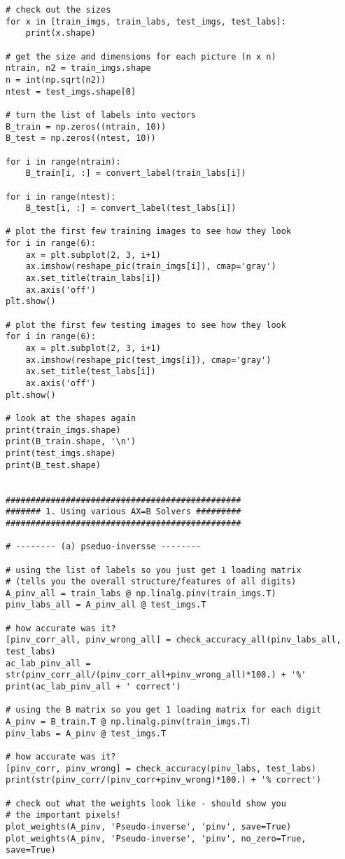 \documentclass[10pt]{article}
\begin{document}
\begin{lstlisting}
# check out the sizes
for x in [train_imgs, train_labs, test_imgs, test_labs]:
    print(x.shape)

# get the size and dimensions for each picture (n x n)
ntrain, n2 = train_imgs.shape
n = int(np.sqrt(n2)) 
ntest = test_imgs.shape[0]

# turn the list of labels into vectors
B_train = np.zeros((ntrain, 10))
B_test = np.zeros((ntest, 10))

for i in range(ntrain):
    B_train[i, :] = convert_label(train_labs[i])

for i in range(ntest):
    B_test[i, :] = convert_label(test_labs[i])
    
# plot the first few training images to see how they look
for i in range(6):
    ax = plt.subplot(2, 3, i+1)
    ax.imshow(reshape_pic(train_imgs[i]), cmap='gray')
    ax.set_title(train_labs[i])
    ax.axis('off')
plt.show()

# plot the first few testing images to see how they look
for i in range(6):
    ax = plt.subplot(2, 3, i+1)
    ax.imshow(reshape_pic(test_imgs[i]), cmap='gray')
    ax.set_title(test_labs[i])
    ax.axis('off')
plt.show()

# look at the shapes again
print(train_imgs.shape)
print(B_train.shape, '\n')
print(test_imgs.shape)
print(B_test.shape)


###############################################
####### 1. Using various AX=B Solvers #########
###############################################

# -------- (a) pseduo-inversse --------

# using the list of labels so you just get 1 loading matrix 
# (tells you the overall structure/features of all digits)
A_pinv_all = train_labs @ np.linalg.pinv(train_imgs.T)
pinv_labs_all = A_pinv_all @ test_imgs.T

# how accurate was it?
[pinv_corr_all, pinv_wrong_all] = check_accuracy_all(pinv_labs_all, test_labs)
ac_lab_pinv_all = str(pinv_corr_all/(pinv_corr_all+pinv_wrong_all)*100.) + '%'
print(ac_lab_pinv_all + ' correct')

# using the B matrix so you get 1 loading matrix for each digit
A_pinv = B_train.T @ np.linalg.pinv(train_imgs.T)
pinv_labs = A_pinv @ test_imgs.T

# how accurate was it?
[pinv_corr, pinv_wrong] = check_accuracy(pinv_labs, test_labs)
print(str(pinv_corr/(pinv_corr+pinv_wrong)*100.) + '% correct')

# check out what the weights look like - should show you 
# the important pixels!
plot_weights(A_pinv, 'Pseudo-inverse', 'pinv', save=True)
plot_weights(A_pinv, 'Pseudo-inverse', 'pinv', no_zero=True, save=True)


\end{lstlisting}
\end{document}
